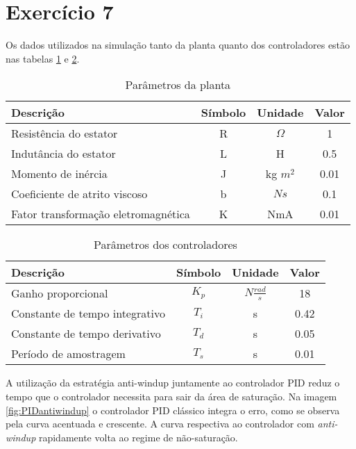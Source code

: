 \section*{Exercício 7}
\label{ex:7}
\raggedbottom

Os dados utilizados na simulação tanto da planta quanto dos controladores estão nas tabelas \ref{tab:ex7planta} e \ref{tab:ex7controlador}. 

\begin{table}[H]
    \centering
    \begin{tabular}{|l|c|c|c|}
    \hline
    Descrição & Símbolo & Unidade & Valor \\ \hline
    Resistência do estator & R & $\Omega$ & 1 \\
    Indutância do estator & L & H & 0.5 \\
    Momento de inércia & J & kg $m^2$  & 0.01 \\
    Coeficiente de atrito viscoso & b & $Ns$ & 0.1 \\
    Fator transformação eletromagnética & K & NmA & 0.01 \\\hline
    \end{tabular}
    \caption{Parâmetros da planta}
    \label{tab:ex7planta}
\end{table}

\begin{table}[H]
    \centering
    \begin{tabular}{|l|c|c|c|}
    \hline
    Descrição & Símbolo & Unidade & Valor \\ \hline
    Ganho proporcional & $K_p$ & $N \frac{rad}{s}$ & 18 \\
    Constante de tempo integrativo & $T_i$ & s & 0.42 \\
    Constante de tempo derivativo & $T_d$ & s  & 0.05 \\
    Período de amostragem & $T_s$ & s & 0.01 \\\hline
    \end{tabular}
    \caption{Parâmetros dos controladores}
    \label{tab:ex7controlador}
\end{table}

A utilização da estratégia anti-windup juntamente ao controlador PID reduz o tempo que o controlador necessita para sair da área de saturação. Na imagem \ref{fig:PIDantiwindup} o controlador PID clássico integra o erro, como se observa pela curva acentuada e crescente. A curva respectiva ao  controlador com \emph{anti-windup} rapidamente volta ao regime de não-saturação.

